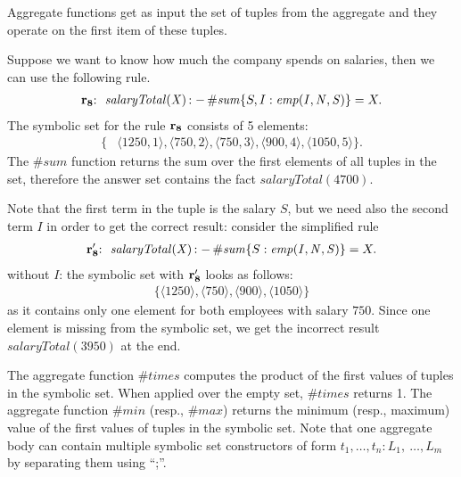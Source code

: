 \documentclass[a4paper, titlepage]{article}
\newcommand{\mi}[1]{\mathit{#1}}
\DeclareMathOperator{\leftimpl}{:-}
\newcommand{\row}[1]{%
  \ensuremath{\color{black}\ensuremath{\mathbf{#1}} \color{black}}%
}
\newcommand{\rowprefix}[1]{%
  \ensuremath{\color{black}\mathbf{#1{:}}\ }%
}
\begin{document}
Aggregate functions get as input the set of tuples from the aggregate
and they operate on the first item of these tuples.
\begin{exmp}
Suppose we want to know how much the company spends on salaries,
then we can use the following rule.
\begin{align*}
  \mathit{\rowprefix{r_8} \ salaryTotal(X)} \leftimpl
    \mathit{\#sum}\{S,I : \mathit{emp(I,N,S)}\} = X.
\end{align*}
The symbolic set for the rule $\row{r_8}$ consists of 5 elements: 
\begin{align*}
  \{ & \langle 1250,1 \rangle, \langle 750,2 \rangle,
    \langle 750,3 \rangle, \langle 900,4 \rangle, \langle 1050,5 \rangle\}.
\end{align*}
The $\mi{\#sum}$ function returns
the sum over the first elements of all tuples in the set,
therefore the answer set contains the fact $\mathit{salaryTotal(4700)}$.

Note that the first term in the tuple is the salary $S$,
but we need also the second term $I$ in order to get the correct result:
consider the simplified rule
\begin{align*}
  \mathit{\rowprefix{r_8'} \ salaryTotal(X)} \leftimpl
    \mathit{\#sum}\{S : \mathit{emp(I,N,S)}\} = X.
\end{align*}
without $I$: the symbolic set with \row{r_8'} looks as follows:
\begin{align*}
  \{ \langle 1250 \rangle, \langle 750 \rangle,
  \langle 900 \rangle,  \langle 1050 \rangle\}
\end{align*}
as it contains only one element for both employees with salary $750$.
Since one element is missing from the symbolic set,
we get the incorrect result $\mathit{salaryTotal(3950)}$ at the end.  
\end{exmp}
 
The aggregate function $\mathit{\#times}$ computes the product of 
the first values of tuples in the symbolic set.
When applied over the empty set, 
$\mathit{\#times}$ returns 1.
%
The aggregate function $\mathit{\#min}$ (resp., $\mi{\#max}$) returns 
the minimum (resp., maximum) value
of the first values of tuples in the symbolic set.
%
%
%
%
%
Note that one aggregate body can contain multiple symbolic set constructors 
of form $t_1, \dots, t_n \colon L_1, \ \dots,L_m$
by separating them using \enquote{;}. 
\end{document}
